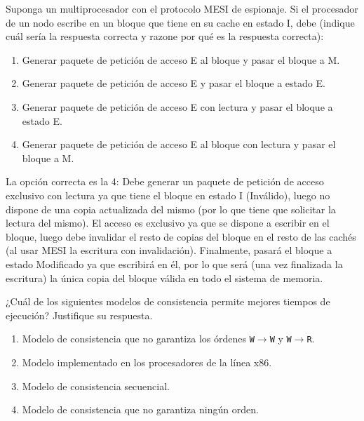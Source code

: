 \begin{cuestion}
    Suponga un multiprocesador con el protocolo MESI de espionaje. Si el procesador de un nodo escribe en un bloque que tiene en su cache en estado I, debe (indique cuál sería la respuesta correcta y razone por qué es la respuesta correcta):
    \begin{enumerate}
        \item Generar paquete de petición de acceso E al bloque y pasar el bloque a M.
        \item Generar paquete de petición de acceso E y pasar el bloque a estado E.
        \item Generar paquete de petición de acceso E con lectura y pasar el bloque a estado E.
        \item Generar paquete de petición de acceso E al bloque con lectura y pasar el bloque a M.
    \end{enumerate}

    La opción correcta es la 4: Debe generar un paquete de petición de acceso exclusivo con lectura ya que tiene el bloque en estado I (Inválido), luego no dispone de una copia actualizada del mismo (por lo que tiene que solicitar la lectura del mismo). El acceso es exclusivo ya que se dispone a escribir en el bloque, luego debe invalidar el resto de copias del bloque en el resto de las cachés (al usar MESI la escritura con invalidación). Finalmente, pasará el bloque a estado Modificado ya que escribirá en él, por lo que será (una vez finalizada la escritura) la única copia del bloque válida en todo el sistema de memoria.
\end{cuestion}

\begin{cuestion}
    ¿Cuál de los siguientes modelos de consistencia permite mejores tiempos de ejecución?
    Justifique su respuesta.
    \begin{enumerate}
        \item Modelo de consistencia que no garantiza los órdenes \verb|W|$\to$\verb|W| y \verb|W|$\to$\verb|R|.
        \item Modelo implementado en los procesadores de la línea x86.
        \item Modelo de consistencia secuencial.
        \item Modelo de consistencia que no garantiza ningún orden.
    \end{enumerate}
\end{cuestion}


